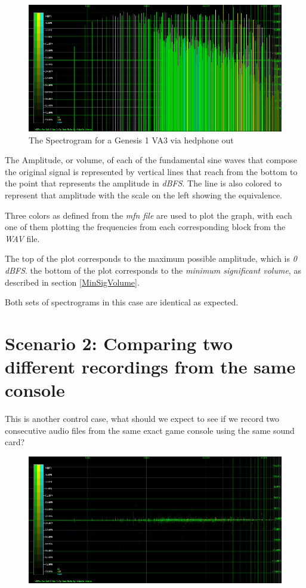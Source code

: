 \documentclass[10pt,a4paper]{report}
\begin{document}
\begin{figure}[H]
	\centering
	\includegraphics[width=1.0\linewidth]{plots/Plot2-SameFile-FM-Spectrogram.png}
	\caption[Spectrogram]{The Spectrogram for a Genesis 1 VA3 via hedphone out}
	\label{fig:plot2-samefile-fm-spectrogram}
\end{figure}

The Amplitude, or volume, of each of the fundamental sine waves that compose the original signal is represented by vertical lines that reach from the bottom to the point that represents the amplitude in \textit{dBFS}\cite{dbfs}. The line is also colored to represent that amplitude with the scale on the left showing the equivalence.

Three colors as defined from the \textit{mfn file} are used to plot the graph, with each one of them plotting the frequencies from each corresponding block from the \textit{WAV} file.

The top of the plot corresponds to the maximum possible amplitude, which is \textit{0 dBFS}. the bottom of the plot corresponds to the \textit{minimum significant volume}, as described in section \ref*{MinSigVolume}.

Both sets of spectrograms in this case are identical as expected. 

\section{Scenario 2: Comparing two different recordings from the same console}

This is another control case, what should we expect to see if we record two consecutive audio files from the same exact game console using the same sound card?

\begin{figure}[H]
	\centering
	\includegraphics[width=1\linewidth]{plots/Plot2-Sameconsole}
	\caption{}
	\label{fig:plot2-sameconsole}
\end{figure}
\end{document}
